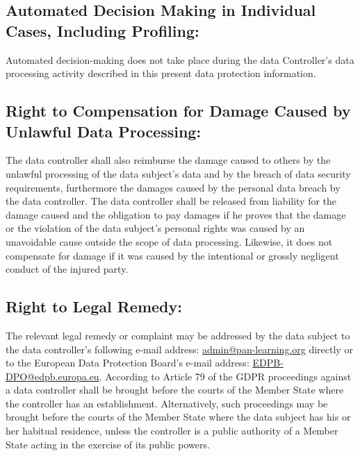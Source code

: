 \documentclass[11pt]{article}
\begin{document}
\subsection{Automated Decision Making in Individual Cases, Including Profiling:}
Automated decision-making does not take place during the data Controller's data processing activity described in this present data protection information.

\subsection{Right to Compensation for Damage Caused by Unlawful Data Processing:}
The data controller shall also reimburse the damage caused to others by the unlawful processing of the data subject's data and by the breach of data security requirements, furthermore the damages caused by the personal data breach by the data controller. The data controller shall be released from liability for the damage caused and the obligation to pay damages if he proves that the damage or the violation of the data subject's personal rights was caused by an unavoidable cause outside the scope of data processing. Likewise, it does not compensate for damage if it was caused by the intentional or grossly negligent conduct of the injured party.

\subsection{Right to Legal Remedy:}
The relevant legal remedy or complaint may be addressed by the data subject to the data controller's following e-mail address: \href{mailto:admin@pan-learning.org}{admin@pan-learning.org} directly or to the European Data Protection Board’s e-mail address: \href{mailto:EDPB-DPO@edpb.europa.eu}{EDPB-DPO@edpb.europa.eu}. According to Article 79 of the GDPR proceedings against a data controller shall be brought before the courts of the Member State where the controller has an establishment. Alternatively, such proceedings may be brought before the courts of the Member State where the data subject has his or her habitual residence, unless the controller is a public authority of a Member State acting in the exercise of its public powers.
\end{document}
